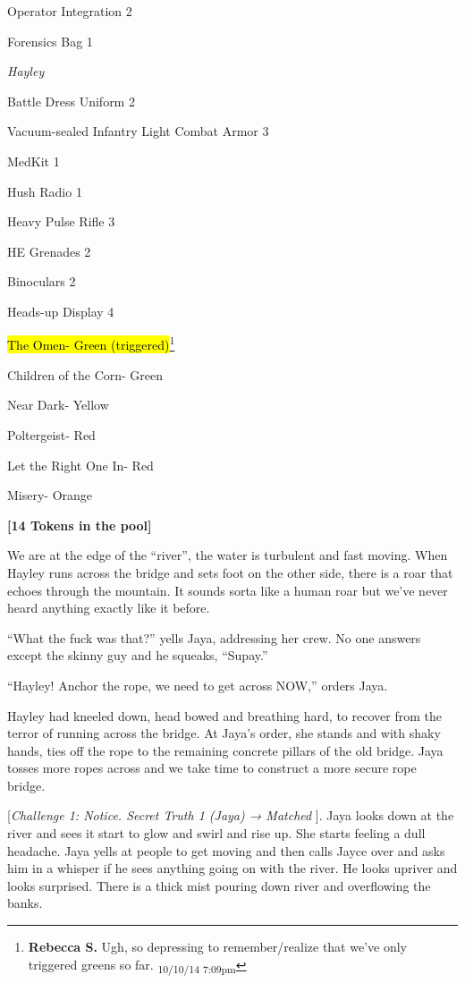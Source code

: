 Operator Integration 2

Forensics Bag 1



\textit{Hayley}

Battle Dress Uniform 2

Vacuum-sealed Infantry Light Combat Armor 3

MedKit 1

Hush Radio 1

Heavy Pulse Rifle 3

HE Grenades 2

Binoculars 2

Heads-up Display 4



\hl{The Omen- Green (triggered)}\footnote{\textbf{Rebecca S. }Ugh, so depressing to remember/realize that we've only triggered greens so far. \textsubscript{10/10/14 7:09pm}}

Children of the Corn- Green

Near Dark- Yellow

Poltergeist- Red

Let the Right One In- Red

Misery- Orange



\textbf{{[}14 Tokens in the pool{]}}



We are at the edge of the ``river'', the water is turbulent and fast moving.  When Hayley runs across the bridge and sets foot on the other side, there is a roar that echoes through the mountain.  It sounds sorta like a human roar but we've never heard anything exactly like it before. 

``What the fuck was that?'' yells Jaya, addressing her crew.  No one answers except the skinny guy and he squeaks, ``Supay.''

``Hayley!  Anchor the rope, we need to get across NOW,'' orders Jaya.

Hayley had kneeled down, head bowed and breathing hard, to recover from the terror of running across the bridge.  At Jaya's order, she stands and with shaky hands, ties off the rope to the remaining concrete pillars of the old bridge.  Jaya tosses more ropes across and we take time to construct a more secure rope bridge. 



{[}\textit{Challenge 1: Notice.  Secret Truth 1 (Jaya) → Matched }{]}.  Jaya looks down at the river and sees it start to glow and swirl and rise up.  She starts feeling a dull headache.  Jaya yells at people to get moving and then calls Jayce over and asks him in a whisper if he sees anything going on with the river.  He looks upriver and looks surprised.  There is a thick mist pouring down river and overflowing the banks. 

